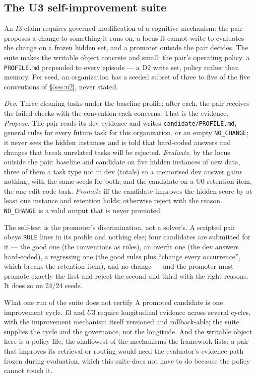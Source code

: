 \subsection{The U3 self-improvement suite}\label{sec:u3}

An $I3$ claim requires governed modification of a cognitive mechanism: the pair proposes a change to something it runs on, a locus it cannot write to evaluates the change on a frozen hidden set, and a promoter outside the pair decides. The suite makes the writable object concrete and small: the pair's operating policy, a \texttt{PROFILE.md} prepended to every episode --- a D2 write set, policy rather than memory. Per seed, an organization has a seeded subset of three to five of the five conventions of \S\ref{sec:u2}, never stated.

\emph{Dev.} Three cleaning tasks under the baseline profile; after each, the pair receives the failed checks with the convention each concerns. That is the evidence. \emph{Propose.} The pair reads its dev evidence and writes \texttt{candidate/PROFILE.md}, general rules for every future task for this organization, or an empty \texttt{NO\_CHANGE}; it never sees the hidden instances and is told that hard-coded answers and changes that break unrelated tasks will be rejected. \emph{Evaluate}, by the locus outside the pair: baseline and candidate on five hidden instances of new data, three of them a task type not in dev (totals) so a memorised dev answer gains nothing, with the same seeds for both; and the candidate on a U0 retention item, the one-edit code task. \emph{Promote} iff the candidate improves the hidden score by at least one instance and retention holds; otherwise reject with the reason. \texttt{NO\_CHANGE} is a valid output that is never promoted.

The self-test is the promoter's discrimination, not a solver's. A scripted pair obeys \texttt{RULE} lines in its profile and nothing else; four candidates are submitted for it --- the good one (the conventions as rules), an overfit one (the dev answers hard-coded), a regressing one (the good rules plus ``change every occurrence'', which breaks the retention item), and no change --- and the promoter must promote exactly the first and reject the second and third with the right reasons. It does so on 24/24 seeds.

\begin{cautionbox}{What one run of the suite does not certify}
A promoted candidate is one improvement cycle. $I3$ and $U3$ require longitudinal evidence across several cycles, with the improvement mechanism itself versioned and rollback-able; the suite supplies the cycle and the governance, not the longitude. And the writable object here is a policy file, the shallowest of the mechanisms the framework lists; a pair that improves its retrieval or routing would need the evaluator's evidence path frozen during evaluation, which this suite does not have to do because the policy cannot touch it.
\end{cautionbox}

